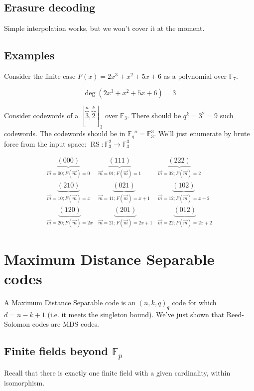 \documentclass{idc_msc}
\newcommand{\Fq}[1][q]{{\mathbb{F}_{#1}}}
\DeclareMathOperator*{\RS}{RS}
\begin{document}
\subsection{Erasure decoding}

Simple interpolation works, but we won't cover it at the moment.

\subsection{Examples}

Consider the finite case \(F(x) = 2x^3 + x^2 + 5x + 6\) as a polynomial over \(\mathbb{F}_7\).

\[\deg(2x^3 + x^2 + 5x + 6) = 3\]

Consider codewords of a \([\overbrace{3}^n,\overbrace{2}^k]_3\) over \(\mathbb{F}_3\).
There should be \(q^k = 3^2 = 9\) such codewords.
The codewords should be in \(\Fq^n = \mathbb{F}_3^3\).
We'll just enumerate by brute force from the input space: \(\RS : \mathbb{F}_3^2 \to \mathbb{F}_3^3\)

\[
\begin{matrix}
\underbrace{(000)}_{\vec{m} = 00; F(\vec{m}) = 0} & \underbrace{(111)}_{\vec{m} = 01; F(\vec{m}) = 1} & \underbrace{(222)}_{\vec{m} = 02; F(\vec{m}) = 2} \\
\underbrace{(210)}_{\vec{m} = 10; F(\vec{m}) = x} & \underbrace{(021)}_{\vec{m} = 11; F(\vec{m}) = x+1} & \underbrace{(102)}_{\vec{m} = 12; F(\vec{m}) = x+2} \\
\underbrace{(120)}_{\vec{m} = 20; F(\vec{m}) = 2x} & \underbrace{(201)}_{\vec{m} = 21; F(\vec{m}) = 2x+1} & \underbrace{(012)}_{\vec{m} = 22; F(\vec{m}) = 2x+2}
\end{matrix}
\]


\clearpage
\section{Maximum Distance Separable codes}

A Maximum Distance Separable code is an \((n,k,q)_q\) code for which \(d = n - k + 1\) (i.e. it meets the singleton bound).
We've just shown that Reed-Solomon codes are MDS codes.

\subsection{Finite fields beyond \texorpdfstring{\(\Fq[p]\)}{Fp}}

Recall that there is exactly one finite field with a given cardinality, within isomorphism.
\end{document}
